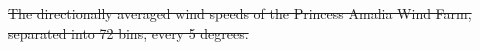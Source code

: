 \documentclass[wes, manuscript]{copernicus}
\providecommand{\DIFdel}[1]{{\protect\color{red}\sout{#1}}}                      %
\providecommand{\DIFaddbegin}{} %
\providecommand{\DIFaddend}{} %
\providecommand{\DIFdelend}{} %
\providecommand{\DIFdelFL}[1]{\DIFdel{#1}} %
\begin{document}
{%
\DIFdelFL{The directionally averaged wind speeds of the Princess Amalia Wind Farm, separated into 72 bins, every 5 degrees.}}
\DIFdelend %
\DIFaddbegin 

\DIFaddend %
\end{document}
